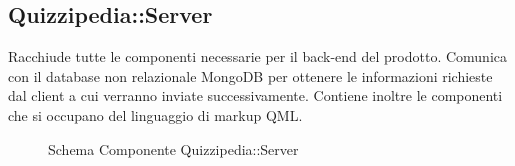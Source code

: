 \subsection{Quizzipedia::Server}
Racchiude tutte le componenti necessarie per il back-end del prodotto. Comunica con il database non relazionale MongoDB per ottenere le informazioni richieste dal client a cui verranno inviate successivamente.
Contiene inoltre le componenti che si occupano del linguaggio di markup QML.
\begin{figure}[H]
\centering
\noindent{}
\caption[Schema Componente Server]{Schema Componente Quizzipedia::Server}
\end{figure}
